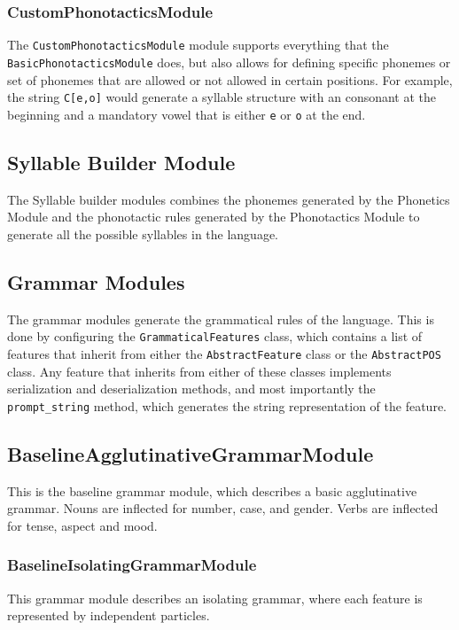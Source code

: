 \subsubsection{CustomPhonotacticsModule}
The \texttt{CustomPhonotacticsModule} module supports everything that the \texttt{BasicPhonotacticsModule} does, but also allows for defining
specific phonemes or set of phonemes that are allowed or not allowed in certain positions. For example, the string \texttt{C[e,o]} would generate a syllable 
structure with an consonant at the beginning and a mandatory vowel that is either \texttt{e} or \texttt{o} at the end.

\subsection{Syllable Builder Module}
The Syllable builder modules combines the phonemes generated by the Phonetics Module and the phonotactic rules generated by the Phonotactics Module to
generate all the possible syllables in the language.

\subsection{Grammar Modules}
The grammar modules generate the grammatical rules of the language. This is done by configuring the \texttt{GrammaticalFeatures} class, which contains a list of features
that inherit from either the \texttt{AbstractFeature} class or the \texttt{AbstractPOS} class. Any feature that inherits from either of these classes implements serialization and deserialization methods, 
and most importantly the \texttt{prompt\_string} method, which generates the string representation of the feature.

\subsection{BaselineAgglutinativeGrammarModule}
This is the baseline grammar module, which describes a basic agglutinative grammar. Nouns are inflected for number, case, and gender. Verbs are inflected for tense, aspect and mood.

\subsubsection{BaselineIsolatingGrammarModule}
This grammar module describes an isolating grammar, where each feature is represented by independent particles.


